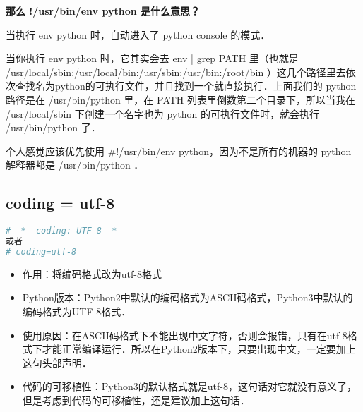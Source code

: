 \textbf{那么 !/usr/bin/env python 是什么意思？}

当执行 env python 时，自动进入了 python console 的模式．

当你执行 env python 时，它其实会去 env | grep PATH 里（也就是 /usr/local/sbin:/usr/local/bin:/usr/sbin:/usr/bin:/root/bin ）这几个路径里去依次查找名为python的可执行文件，并且找到一个就直接执行．上面我们的 python 路径是在 /usr/bin/python 里，在 PATH 列表里倒数第二个目录下，所以当我在 /usr/local/sbin 下创建一个名字也为 python 的可执行文件时，就会执行 /usr/bin/python 了．

个人感觉应该优先使用 #!/usr/bin/env python，因为不是所有的机器的 python 解释器都是 /usr/bin/python ．

\subsection{coding = utf-8 }\label{Pynot1_sub4}
\begin{lstlisting}[language=python]
# -*- coding: UTF-8 -*-
或者
# coding=utf-8
\end{lstlisting}
\begin{itemize}
\item 作用：将编码格式改为utf-8格式
\item Python版本：Python2中默认的编码格式为ASCII码格式，Python3中默认的编码格式为UTF-8格式．
\item 使用原因：在ASCII码格式下不能出现中文字符，否则会报错，只有在utf-8格式下才能正常编译运行．所以在Python2版本下，只要出现中文，一定要加上这句头部声明．
\item 代码的可移植性：Python3的默认格式就是utf-8，这句话对它就没有意义了，但是考虑到代码的可移植性，还是建议加上这句话．
\end{itemize}

